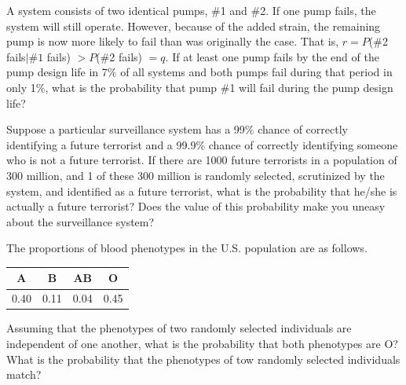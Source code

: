\documentclass[12pt,letterpaper]{hmcpset}
\begin{document}
\begin{solution}

\end{solution}
\newpage

\begin{problem}[2.4.52]
A system consists of two identical pumps, $\#$1 and $\#$2. If one pump fails, the system will still operate. However, because of the added strain, the remaining pump is now more likely to fail than was originally the case. That is, $r = P$($\#$2 fails$|\#1$ fails) $> P$($\#$2 fails) $= q$. If at least one pump fails by the end of the pump design life in 7$\%$ of all systems and both pumps fail during that period in only 1$\%$, what is the probability that pump $\#$1 will fail during the pump design life?
\end{problem}

\begin{solution}

\end{solution}
\newpage

\begin{problem}[2.4.67]
Suppose a particular surveillance system has a 99$\%$ chance of correctly identifying a future terrorist and a 99.9$\%$ chance of correctly identifying someone who is not a future terrorist. If there are 1000 future terrorists in a population of 300 million, and 1 of these 300 million is randomly selected, scrutinized by the system, and identified as a future terrorist, what is the probability that he/she is actually a future terrorist? Does the value of this probability make you uneasy about the surveillance system?

\end{problem}

\begin{solution}

\end{solution}
\newpage

\begin{problem}[2.5.74]
The proportions of blood phenotypes in the U.S. population are as follows.\\
\begin{center}
	\begin{tabular}{c|c|c|c}
 		A & B & AB & O \\
 		\hline
 		0.40 & 0.11 & 0.04 & 0.45
	 \end{tabular}
\end{center}
Assuming that the phenotypes of two randomly selected individuals are independent of one another, what is the probability that both phenotypes are O? What is the probability that the phenotypes of tow randomly selected individuals match?
\end{problem}
\end{document}
